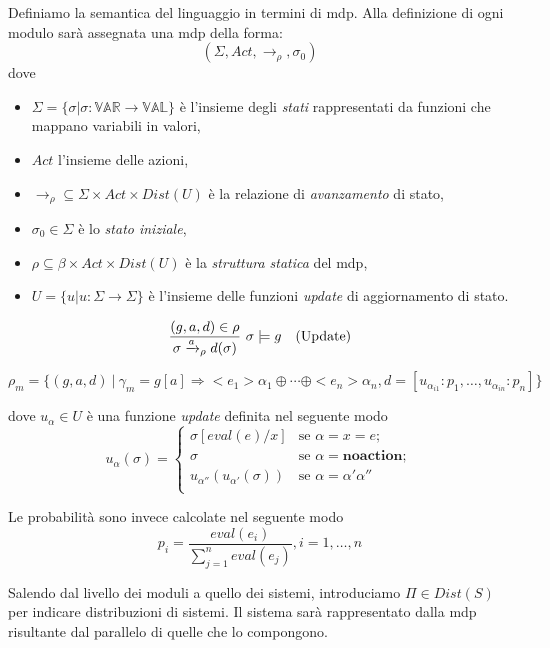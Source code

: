 Definiamo la semantica del linguaggio in termini di \ac{mdp}. Alla definizione di ogni modulo sarà assegnata una \ac{mdp} della forma:
$$ (\Sigma,Act,\rightarrow_\rho,\sigma_0) $$
dove 
\begin{itemize}
	\item $\Sigma = \{\sigma | \sigma : \mathbb{VAR} \rightarrow \mathbb{VAL}\}$ è l'insieme degli \emph{stati} rappresentati da funzioni che mappano variabili in valori,
	\item $Act$ l'insieme delle azioni,
	\item $\rightarrow_\rho \subseteq \Sigma \times Act \times Dist(U)$ è la relazione di \emph{avanzamento} di stato,
	\item $\sigma_0 \in \Sigma$ è lo \emph{stato iniziale},
	\item $\rho \subseteq \beta \times Act \times Dist(U)$ è la \emph{struttura statica} del \ac{mdp},
	\item $U = \{u | u : \Sigma \rightarrow \Sigma \}$ è l'insieme delle funzioni \emph{update} di aggiornamento di stato.
\end{itemize}

$$
\begin{array}{cl}
	\displaystyle{\frac{(g,a,d) \in \rho}{\sigma \xrightarrow{a}_\rho d(\sigma)} \mbox{ }\sigma \models g} & \mbox{(Update)} \\
\end{array}
$$

$$
\rho_m = \{(g,a,d)\ |\ \gamma_m = g[a] \Rightarrow <e_1> \alpha_1 \oplus \cdots \oplus <e_n> \alpha_n, d=[u_{\alpha_{i 1}}:p_1, \dots, u_{\alpha_{i n}}:p_n]\}
$$

dove $u_\alpha \in U$ è una funzione \emph{update} definita nel seguente modo
$$ 
u_{\alpha}(\sigma) = \left\{
\begin{array}{ll}
	\sigma[eval(e)/x]	& \mbox{se } \alpha = x = e; \\
	\sigma				& \mbox{se } \alpha = \mathbf{noaction}; \\
	u_{\alpha''}(u_{\alpha'}(\sigma))	& \mbox{se } \alpha = \alpha' \alpha'' \\
\end{array}
\right.
$$

Le probabilità sono invece calcolate nel seguente modo
$$ p_i = \frac{eval(e_i)}{\sum_{j=1}^{n}eval(e_j)},i=1,\dots,n $$

Salendo dal livello dei moduli a quello dei sistemi, introduciamo $\Pi \in Dist(S) $ per indicare distribuzioni di sistemi. Il sistema sarà rappresentato dalla \ac{mdp} risultante dal parallelo di quelle che lo compongono.

